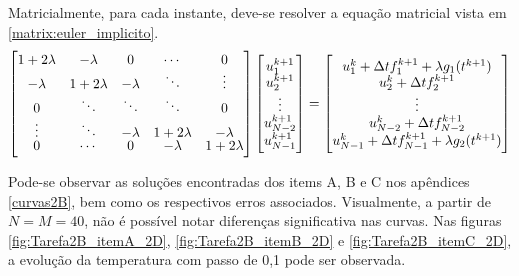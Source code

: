\documentclass[12pt]{article}
\begin{document}
\begin{spacing}{1.5}
Matricialmente, para cada instante, deve-se resolver a equação matricial vista em \eqref{matrix:euler_implicito}.
\begin{gather}\label{matrix:euler_implicito}
    \renewcommand*{\arraystretch}{0.75}
    \begin{bmatrix}
    1+2\lambda & -\lambda & 0 & \cdots & 0\\
    -\lambda & 1+2\lambda & -\lambda & \ddots & \vdots\\
    0 & \ddots & \ddots & \ddots & 0 \\
    \vdots & \ddots & -\lambda & 1+2\lambda & -\lambda \\
    0 & \cdots & 0 & -\lambda & 1+2\lambda
    \end{bmatrix}
    \begin{bmatrix}
    u_1^{k+1} \\
    u_2^{k+1} \\
    \vdots \\
    u_{N-2}^{k+1} \\
    u_{N-1}^{k+1}
    \end{bmatrix}
    =
    \begin{bmatrix}
    u_1^k + \Delta t f_1^{k+1} + \lambda g_1(t^{k+1}) \\
    u_2^k + \Delta t f_2^{k+1} \\
    \vdots \\
    u_{N-2}^k + \Delta t f_{N-2}^{k+1} \\
    u_{N-1}^k + \Delta t f_{N-1}^{k+1} + \lambda g_2(t^{k+1})
    \end{bmatrix}
\end{gather}

 Pode-se observar as soluções encontradas dos items A, B e C nos apêndices \ref{curvas2B}, bem como os respectivos erros associados. Visualmente, a partir de $N=M=40$, não é possível notar diferenças significativa nas curvas. Nas figuras \ref{fig:Tarefa2B_itemA_2D}, \ref{fig:Tarefa2B_itemB_2D} e \ref{fig:Tarefa2B_itemC_2D}, a evolução da temperatura com passo de 0,1 pode ser observada.


\end{spacing}
\end{document}
